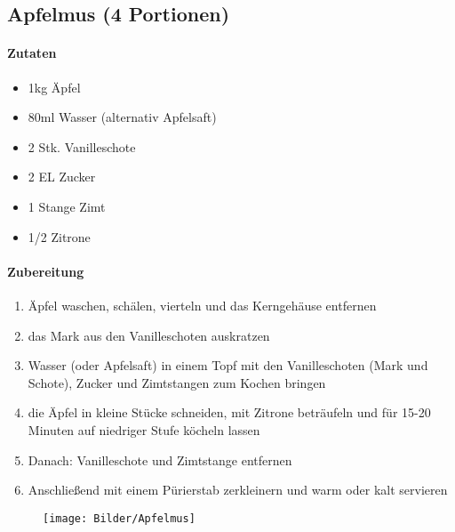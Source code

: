 \newpage
\subsection{Apfelmus (4 Portionen)}
\paragraph{Zutaten}
\begin{itemize}[noitemsep]
	\item 1kg Äpfel
	\item 80ml Wasser (alternativ Apfelsaft)
	\item 2 Stk. Vanilleschote
	\item 2 EL Zucker
	\item 1 Stange Zimt
	\item 1/2 Zitrone
\end{itemize}
\paragraph{Zubereitung}
\begin{enumerate}[noitemsep]
	\item Äpfel waschen, schälen, vierteln und das Kerngehäuse entfernen 
	\item das Mark aus den Vanilleschoten auskratzen 
	\item Wasser (oder Apfelsaft) in einem Topf mit den Vanilleschoten (Mark und Schote), Zucker und Zimtstangen zum Kochen bringen
	\item die Äpfel in kleine Stücke schneiden, mit Zitrone beträufeln und für 15-20 Minuten auf niedriger Stufe köcheln lassen 
	\item Danach: Vanilleschote und Zimtstange entfernen
	\item Anschließend mit einem Pürierstab zerkleinern und warm oder kalt servieren 
\end{enumerate}
\begin{figure}[h]
\centering
\texttt{[image: Bilder/Apfelmus]}
\end{figure}